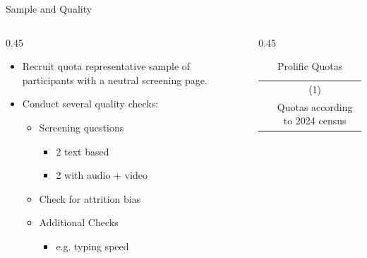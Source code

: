 \documentclass{beamer}
\begin{document}
\begin{frame}{Sample and Quality}
\label{Quotas}
\begin{columns}[T] %
  \begin{column}{0.45\textwidth} %
  \begin{itemize}
    \vspace{2em}
      \item Recruit \alert{quota representative sample} of participants with a neutral screening page.
      \vspace{1em}
      \item Conduct several quality checks:
      \begin{itemize}
        \vspace{0.25em}
          \item Screening questions
          \begin{itemize}
              \item 2 text based
              \item 2 with audio + video
          \end{itemize}
          \vspace{0.25em}
          \item Check for attrition bias
          \vspace{0.25em}
          \item Additional Checks 
          \begin{itemize}
              \item e.g. typing speed
          \end{itemize}
          
      \end{itemize}
  \end{itemize}
  \vspace{2em}
  \hyperlink{pretreatment}{}
  \end{column}
  \begin{column}{0.45\textwidth} %
\vspace{-2.5em}
\begin{table}[!htbp]\centering
\tiny
\caption{Prolific Quotas}
\label{tab:prolificquotas}
\begin{threeparttable}
\begin{tabular}{lc}
\toprule
& (1) \\
& Quotas according to 2024 census  \\


\end{tabular}
\end{threeparttable}
\end{table}
\end{column}
\end{columns}
\end{frame}
\end{document}

